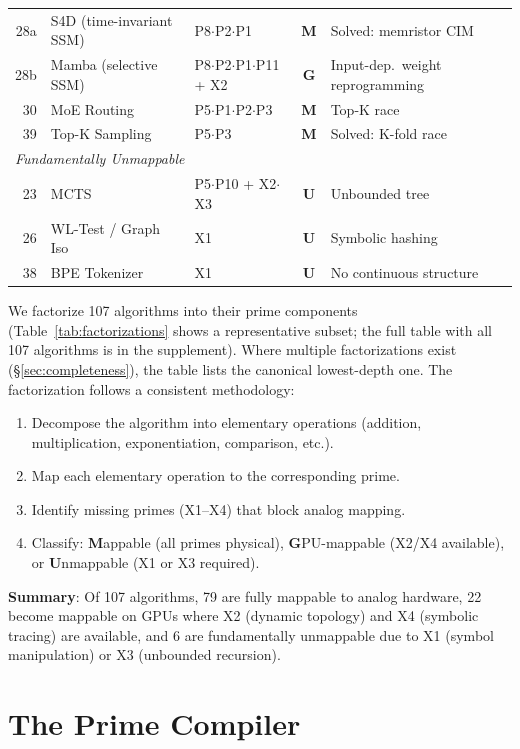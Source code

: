 \documentclass[11pt]{article}
\begin{document}
\begin{table}[t]
\begin{tabular}{rllcl}
28a & S4D (time-invariant SSM) & P8$\cdot$P2$\cdot$P1 & \textbf{M} & Solved: memristor CIM~\cite{zhang2025ssm} \\
28b & Mamba (selective SSM) & P8$\cdot$P2$\cdot$P1$\cdot$P11 + X2 & \textbf{G} & Input-dep.\ weight reprogramming \\
30 & MoE Routing & P5$\cdot$P1$\cdot$P2$\cdot$P3 & \textbf{M} & Top-K race~\cite{bieg2025} \\
39 & Top-K Sampling & P5$\cdot$P3 & \textbf{M} & Solved: K-fold race~\cite{bieg2026} \\
\midrule
\multicolumn{5}{l}{\textit{Fundamentally Unmappable}} \\
23 & MCTS & P5$\cdot$P10 + X2$\cdot$X3 & \textbf{U} & Unbounded tree \\
26 & WL-Test / Graph Iso & X1 & \textbf{U} & Symbolic hashing \\
38 & BPE Tokenizer & X1 & \textbf{U} & No continuous structure \\
\bottomrule
\end{tabular}
\end{table}

We factorize 107 algorithms into their prime components (Table~\ref{tab:factorizations} shows a representative subset; the full table with all 107 algorithms is in the supplement). Where multiple factorizations exist (\S\ref{sec:completeness}), the table lists the canonical lowest-depth one. The factorization follows a consistent methodology:

\begin{enumerate}[leftmargin=*]
\item Decompose the algorithm into elementary operations (addition, multiplication, exponentiation, comparison, etc.).
\item Map each elementary operation to the corresponding prime.
\item Identify missing primes (X1--X4) that block analog mapping.
\item Classify: \textbf{M}appable (all primes physical), \textbf{G}PU-mappable (X2/X4 available), or \textbf{U}nmappable (X1 or X3 required).
\end{enumerate}

\textbf{Summary}: Of 107 algorithms, 79 are fully mappable to analog hardware, 22 become mappable on GPUs where X2 (dynamic topology) and X4 (symbolic tracing) are available, and 6 are fundamentally unmappable due to X1 (symbol manipulation) or X3 (unbounded recursion).

\section{The Prime Compiler}
\label{sec:compiler}
\end{document}
